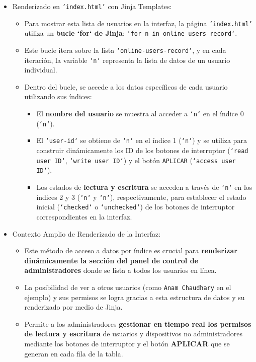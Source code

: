 \documentclass{report}
\begin{document}
\begin{itemize}
    \item Renderizado en \texttt{'index.html'} con Jinja Templates:
    \begin{itemize}
        \item Para mostrar esta lista de usuarios en la interfaz, la página \texttt{'index.html'} utiliza un \textbf{bucle `for` de Jinja}: 
        \texttt{`for n in online users record`}.
        \item Este bucle itera sobre la lista \texttt{`online-users-record`}, y en cada iteración, la variable \texttt{`n`} representa la lista de 
        datos de un usuario individual.
        \item Dentro del bucle, se accede a los datos específicos de cada usuario utilizando sus índices:
        \begin{itemize}
            \item El \textbf{nombre del usuario} se muestra al acceder a \texttt{`n`} en el índice 0 (\texttt{`n`}).
            \item El \texttt{`user-id`} se obtiene de \texttt{`n`} en el índice 1 (\texttt{`n`}) y se utiliza para construir dinámicamente los ID de 
            los botones de interruptor (\texttt{`read user ID`}, \texttt{`write user ID`}) y el botón \texttt{APLICAR} (\texttt{`access user ID`}).
            \item Los estados de \textbf{lectura y escritura} se acceden a través de \texttt{`n`} en los índices 2 y 3 (\texttt{`n`} y \texttt{`n`}), 
            respectivamente, para establecer el estado inicial (\texttt{`checked`} o \texttt{`unchecked`}) de los botones de interruptor correspondientes 
            en la interfaz.
        \end{itemize}
    \end{itemize}

    \item Contexto Amplio de Renderizado de la Interfaz:
    \begin{itemize}
        \item Este método de acceso a datos por índice es crucial para \textbf{renderizar dinámicamente la sección del panel de control de administradores} 
        donde se lista a todos los usuarios en línea.
        \item La posibilidad de ver a otros usuarios (como \texttt{Anam Chaudhary} en el ejemplo) y sus permisos se logra gracias a esta estructura de 
        datos y su renderizado por medio de Jinja.
        \item Permite a los administradores \textbf{gestionar en tiempo real los permisos de lectura y escritura} de usuarios y dispositivos no 
        administradores mediante los botones de interruptor y el botón \textbf{APLICAR} que se generan en cada fila de la tabla.    
    \end{itemize}
\end{itemize}
\end{document}

